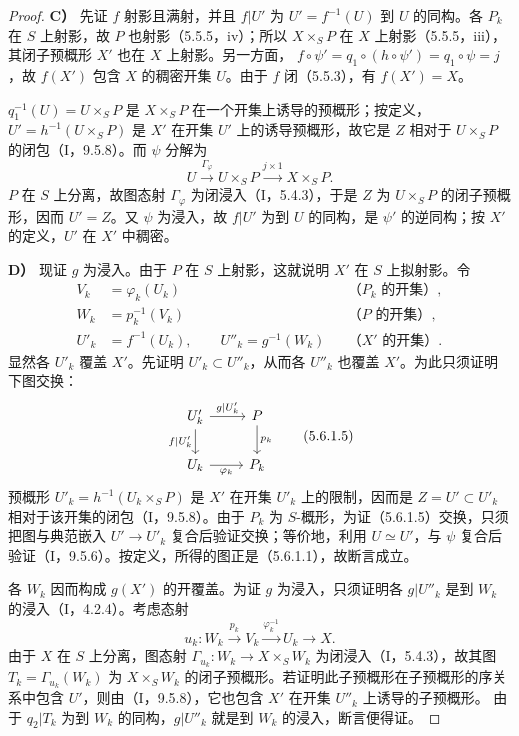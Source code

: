 \begin{proof}
\textbf{C）} 先证 $f$ 射影且满射，并且 $f|U'$ 为 $U'=f^{-1}(U)$ 到 $U$ 的同构。各 $P_k$ 在 $S$ 上射影，故 $P$ 也射影（5.5.5，iv）；所以 $X\times_S P$ 在 $X$ 上射影（5.5.5，iii），其闭子预概形 $X'$ 也在 $X$ 上射影。另一方面，
$f\circ\psi'=q_1\circ(h\circ\psi')=q_1\circ\psi=j$，故 $f(X')$ 包含 $X$ 的稠密开集 $U$。由于 $f$ 闭（5.5.3），有 $f(X')=X$。

$q_1^{-1}(U)=U\times_S P$ 是 $X\times_S P$ 在一个开集上诱导的预概形；按定义，$U'=h^{-1}(U\times_S P)$ 是 $X'$ 在开集 $U'$ 上的诱导预概形，故它是 $Z$ 相对于 $U\times_S P$ 的闭包（I，9.5.8）。而 $\psi$ 分解为
\[
U\xrightarrow{\Gamma_\varphi}U\times_S P
\xrightarrow{j\times1}X\times_S P.
\]
$P$ 在 $S$ 上分离，故图态射 $\Gamma_\varphi$ 为闭浸入（I，5.4.3），于是 $Z$ 为 $U\times_S P$ 的闭子预概形，因而 $U'=Z$。又 $\psi$ 为浸入，故 $f|U'$ 为到 $U$ 的同构，是 $\psi'$ 的逆同构；按 $X'$ 的定义，$U'$ 在 $X'$ 中稠密。

\textbf{D）} 现证 $g$ 为浸入。由于 $P$ 在 $S$ 上射影，这就说明 $X'$ 在 $S$ 上拟射影。令
\[
\begin{aligned}
V_k&=\varphi_k(U_k)&&\text{（$P_k$ 的开集）},\\
W_k&=p_k^{-1}(V_k)&&\text{（$P$ 的开集）},\\
U'_k&=f^{-1}(U_k),\qquad U''_k=g^{-1}(W_k)
&&\text{（$X'$ 的开集）}.
\end{aligned}
\]
显然各 $U'_k$ 覆盖 $X'$。先证明 $U'_k\subset U''_k$，从而各 $U''_k$ 也覆盖 $X'$。为此只须证明下图交换：
\begin{equation}
\begin{tikzcd}
U'_k\arrow[r,"g|U'_k"]\arrow[d,"f|U'_k"']&P\arrow[d,"p_k"]\\
U_k\arrow[r,"\varphi_k"']&P_k
\end{tikzcd}
\tag{5.6.1.5}
\end{equation}
预概形 $U'_k=h^{-1}(U_k\times_S P)$ 是 $X'$ 在开集 $U'_k$ 上的限制，因而是 $Z=U'\subset U'_k$ 相对于该开集的闭包（I，9.5.8）。由于 $P_k$ 为 $S$-概形，为证（5.6.1.5）交换，只须把图与典范嵌入 $U'\to U'_k$ 复合后验证交换；等价地，利用 $U\simeq U'$，与 $\psi$ 复合后验证（I，9.5.6）。按定义，所得的图正是（5.6.1.1），故断言成立。

各 $W_k$ 因而构成 $g(X')$ 的开覆盖。为证 $g$ 为浸入，只须证明各 $g|U''_k$ 是到 $W_k$ 的浸入（I，4.2.4）。考虑态射
\[
u_k:W_k\xrightarrow{p_k}V_k\xrightarrow{\varphi_k^{-1}}U_k\longrightarrow X.
\]
由于 $X$ 在 $S$ 上分离，图态射 $\Gamma_{u_k}:W_k\to X\times_S W_k$ 为闭浸入（I，5.4.3），故其图
$T_k=\Gamma_{u_k}(W_k)$ 为 $X\times_S W_k$ 的闭子预概形。若证明此子预概形在子预概形的序关系中包含 $U'$，则由（I，9.5.8），它也包含 $X'$ 在开集 $U''_k$ 上诱导的子预概形。
由于 $q_2|T_k$ 为到 $W_k$ 的同构，$g|U''_k$ 就是到 $W_k$ 的浸入，断言便得证。


\end{proof}
